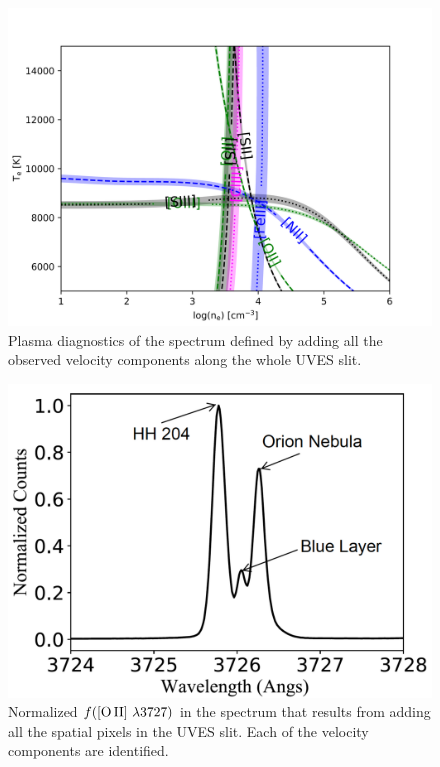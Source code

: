 \documentclass[twocolumn]{aastex63}
\begin{document}
\begin{figure}
\centering
\includegraphics[width=\columnwidth]{physical_diag_integrado.png}
\caption{Plasma diagnostics of the spectrum defined by adding all the observed velocity components along the whole UVES slit.}
\label{fig:plasma_mixed}
\end{figure}


\begin{figure}
\centering
\includegraphics[width=\columnwidth]{low_spectral_flux.pdf}
\caption{Normalized $f(\text{[O\thinspace II] } \lambda 3727)$ in the spectrum that results from adding all the spatial pixels in the UVES slit. Each of the velocity components are identified.}
\label{fig:low_spectral_flux_3727}
\end{figure}
\end{document}
